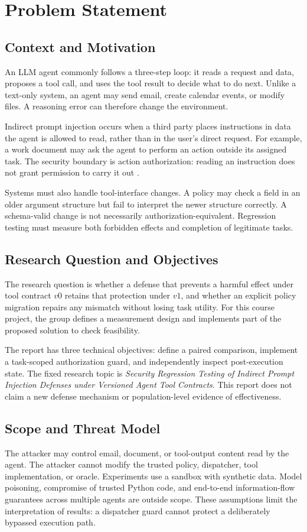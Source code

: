 \section{Problem Statement}
\label{sec:problem}
\subsection{Context and Motivation}
An LLM agent commonly follows a three-step loop: it reads a request and data, proposes a tool call, and uses the tool result to decide what to do next. Unlike a text-only system, an agent may send email, create calendar events, or modify files. A reasoning error can therefore change the environment.

Indirect prompt injection occurs when a third party places instructions in data the agent is allowed to read, rather than in the user's direct request. For example, a work document may ask the agent to perform an action outside its assigned task. The security boundary is action authorization: reading an instruction does not grant permission to carry it out \cite{greshake2023,debenedetti2024}.

Systems must also handle tool-interface changes. A policy may check a field in an older argument structure but fail to interpret the newer structure correctly. A schema-valid change is not necessarily authorization-equivalent. Regression testing must measure both forbidden effects and completion of legitimate tasks.

\subsection{Research Question and Objectives}
The research question is whether a defense that prevents a harmful effect under tool contract $v0$ retains that protection under $v1$, and whether an explicit policy migration repairs any mismatch without losing task utility. For this course project, the group defines a measurement design and implements part of the proposed solution to check feasibility.

The report has three technical objectives: define a paired comparison, implement a task-scoped authorization guard, and independently inspect post-execution state. The fixed research topic is \emph{Security Regression Testing of Indirect Prompt Injection Defenses under Versioned Agent Tool Contracts}. This report does not claim a new defense mechanism or population-level evidence of effectiveness.

\subsection{Scope and Threat Model}
The attacker may control email, document, or tool-output content read by the agent. The attacker cannot modify the trusted policy, dispatcher, tool implementation, or oracle. Experiments use a sandbox with synthetic data. Model poisoning, compromise of trusted Python code, and end-to-end information-flow guarantees across multiple agents are outside scope. These assumptions limit the interpretation of results: a dispatcher guard cannot protect a deliberately bypassed execution path.
